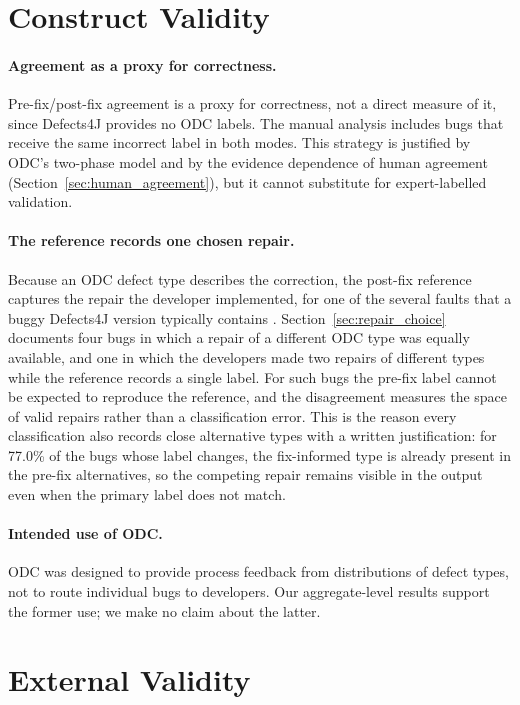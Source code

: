 \documentclass{iutbscthesis}
\begin{document}
\section{Construct Validity}

\paragraph{Agreement as a proxy for correctness.} Pre-fix/post-fix agreement is a proxy for correctness, not a direct measure of it, since Defects4J provides no ODC labels. The manual analysis includes bugs that receive the same incorrect label in both modes. This strategy is justified by ODC's two-phase model and by the evidence dependence of human agreement (Section~\ref{sec:human_agreement}), but it cannot substitute for expert-labelled validation.

\paragraph{The reference records one chosen repair.} Because an ODC defect type describes the correction, the post-fix reference captures the repair the developer implemented, for one of the several faults that a buggy Defects4J version typically contains \cite{callaghan2024mf}. Section~\ref{sec:repair_choice} documents four bugs in which a repair of a different ODC type was equally available, and one in which the developers made two repairs of different types while the reference records a single label. For such bugs the pre-fix label cannot be expected to reproduce the reference, and the disagreement measures the space of valid repairs rather than a classification error. This is the reason every classification also records close alternative types with a written justification: for 77.0\% of the bugs whose label changes, the fix-informed type is already present in the pre-fix alternatives, so the competing repair remains visible in the output even when the primary label does not match.

\paragraph{Intended use of ODC.} ODC was designed to provide process feedback from distributions of defect types, not to route individual bugs to developers. Our aggregate-level results support the former use; we make no claim about the latter.

\section{External Validity}
\end{document}
